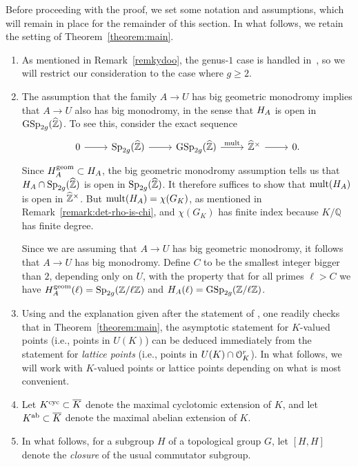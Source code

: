 Before proceeding with the proof, we set some notation and assumptions, which will remain in place for the remainder of this section. In what follows, we retain the setting of Theorem~\ref{theorem:main}.
\begin{enumerate}
\item As mentioned in Remark~\ref{remkydoo}, the genus-$1$ case is handled in~\cite[Theorem 7.1]{zywina2010hilbert}, so we will restrict our consideration to the case where $g \geq 2$.
\item 	The assumption that the family $A \to U$ has big geometric 	monodromy implies that $A \to U$ also has big monodromy, in the sense that $H_A$ is open in $\operatorname{GSp}_{2g}(\widehat{\mathbb Z})$. To see this, consider the exact sequence
    \[
    	\begin{tikzcd}
        	0 \ar{r} & \Sp_{2g}(\zh) \ar{r} & \GSp_{2g}(\zh) \ar{r}{\on{mult}} & \zh^\times \ar{r} & 0.
        \end{tikzcd}
    \]
    Since $H_A^{\operatorname{geom}} \subset H_A$, the big geometric monodromy assumption tells us that $H_A \cap \operatorname{Sp}_{2g}(\widehat{{\mathbb Z}})$ is open in $\operatorname{Sp}_{2g}(\widehat{{\mathbb Z}})$. It therefore suffices to show that $\operatorname{mult}(H_A)$ is open in $\widehat{{\mathbb Z}}^\times$. But $\operatorname{mult}(H_A) = \chi(G_K)$, as mentioned in Remark~\ref{remark:det-rho-is-chi}, and $\chi(G_K)$ has finite index because $K/\mathbb Q$ has finite degree.

Since we are assuming that $A \to U$ has big geometric monodromy, it follows that $A \to U$ has big monodromy. Define $C$ to be the smallest
integer bigger than $2$, depending only on $U$, with the property that for all primes $\ell > C$ we have $H_A^{\operatorname{geom}}(\ell) = \operatorname{Sp}_{2g}(\mathbb Z/\ell \mathbb Z)$ and $H_A(\ell) = \operatorname{GSp}_{2g}(\mathbb Z/\ell \mathbb Z)$.
\item Using \cite[Proposition 6.1]{zywina2010hilbert} and the explanation
	given after the statement of
	\cite[Theorem 7.1]{zywina2010hilbert}, one readily checks that in Theorem~\ref{theorem:main}, the asymptotic statement for $K$-valued points (i.e., points in $U(K)$) can be deduced immediately from the statement for \emph{lattice points} (i.e., points in $U(K) \cap \mathcal O_K^r$). In what follows, we will work with $K$-valued points or lattice points depending on what is most convenient.
\item Let $K^{\operatorname{cyc}} \subset \overline{K}$ denote the maximal cyclotomic extension of $K$, and let $K^{\text{ab}} \subset \overline{K}$ denote the maximal abelian extension of $K$.
\item In what follows, for a subgroup $H$ of a topological group $G$, let $[H,H]$ denote the \emph{closure} of the usual commutator subgroup.
\end{enumerate}

